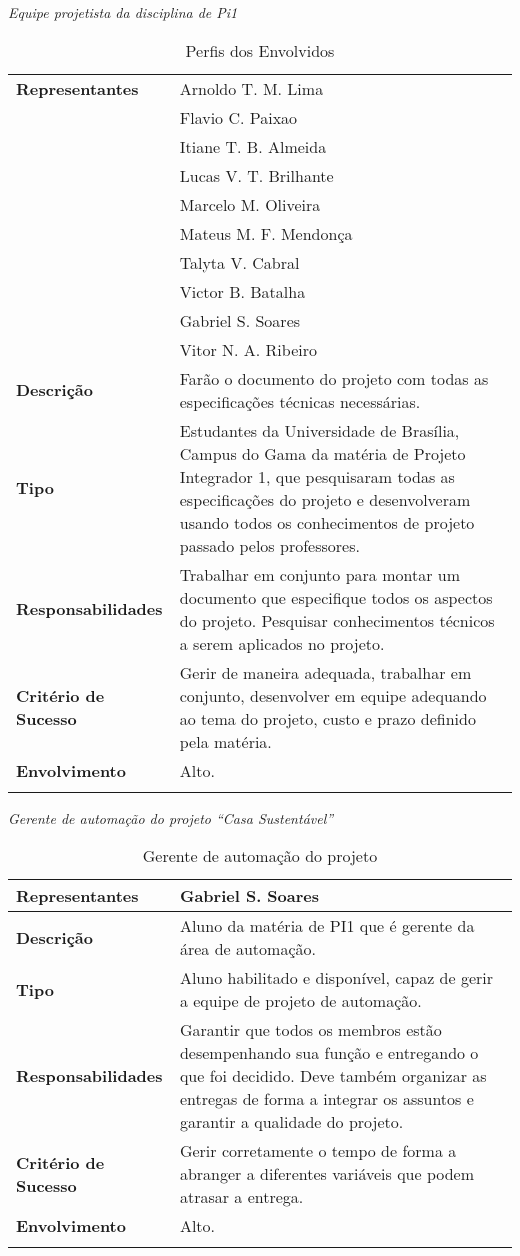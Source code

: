 
\textit{Equipe projetista da disciplina de Pi1}

\begin{longtable}{|m{5cm}|m{10cm}|}
	\hline \textbf{Representantes} & Arnoldo T. M. Lima\\ & Flavio C. Paixao\\ & Itiane T. B. Almeida\\ & Lucas V. T.
	Brilhante\\ & Marcelo M. Oliveira\\ & Mateus M. F. Mendon\c{c}a\\ & Talyta V. Cabral\\ & Victor B. Batalha\\ &
	Gabriel S. Soares\\ & Vitor N. A. Ribeiro\\
	\hline \textbf{Descrição} & Farão o documento do projeto com todas as especificações técnicas necessárias.\\
	\hline \textbf{Tipo} & Estudantes da Universidade de Brasília, Campus do Gama da matéria de Projeto Integrador 1,
	que pesquisaram todas as especificações do projeto e desenvolveram usando todos os conhecimentos de projeto passado
	pelos professores.\\
	\hline \textbf{Responsabilidades} & Trabalhar em conjunto para montar um documento que especifique todos os aspectos
	 do projeto. Pesquisar conhecimentos técnicos a serem aplicados no projeto.\\
	\hline \textbf{Critério de Sucesso} & Gerir de maneira adequada, trabalhar em conjunto, desenvolver em equipe
	adequando ao tema do projeto, custo e prazo definido pela matéria.\\
	\hline \textbf{Envolvimento} & Alto.\\
	\hline
\caption{Perfis dos Envolvidos}
\label{Perfis_dos_Envolvidos}
\end{longtable}

\textit{Gerente de automação do projeto “Casa Sustentável”}

\begin{longtable}{|m{5cm}|m{10cm}|}
	\hline \textbf{Representantes} & Gabriel S. Soares\\
	\hline \textbf{Descrição} & Aluno da matéria de PI1 que é gerente da área de automação.\\
	\hline \textbf{Tipo} & Aluno habilitado e disponível, capaz de gerir a equipe de projeto de automação.\\
	\hline \textbf{Responsabilidades} & Garantir que todos os membros estão desempenhando sua função e entregando o que
	 foi decidido. Deve também organizar as entregas de forma a integrar os assuntos e garantir a qualidade do projeto.\\
	\hline \textbf{Critério de Sucesso} & Gerir corretamente o tempo de forma a abranger a diferentes variáveis que
	podem atrasar a entrega.\\
	\hline \textbf{Envolvimento} & Alto.\\
	\hline
\caption{Gerente de automação do projeto}
\label{Gerente_de_automacao_do_projeto}
\end{longtable}

